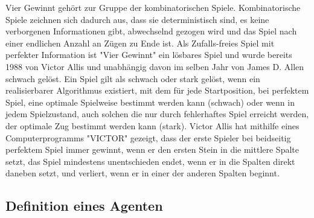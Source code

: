 Vier Gewinnt gehört zur Gruppe der kombinatorischen Spiele. Kombinatorische Spiele zeichnen sich dadurch aus, dass sie deterministisch sind, es keine verborgenen Informationen gibt, abwechselnd gezogen wird und das Spiel nach einer endlichen Anzahl an Zügen zu Ende ist\autocite{KombinatorischeSpieltheorie2019}. Als Zufalls-freies Spiel mit perfekter Information ist "Vier Gewinnt" ein lösbares Spiel und wurde bereits 1988 von Victor Allis\autocite{allisKnowledgeBasedApproachConnectFour1988} und unabhängig davon im selben Jahr von James D. Allen schwach gelöst\autocite{allenExpertPlayConnectFour}. Ein Spiel gilt als schwach oder stark gelöst, wenn ein realisierbarer Algorithmus existiert, mit dem für jede Startposition, bei perfektem Spiel, eine optimale Spielweise bestimmt werden kann (schwach) oder wenn in jedem Spielzustand, auch solchen die nur durch fehlerhaftes Spiel erreicht werden, der optimale Zug bestimmt werden kann (stark)\autocite{GeloesteSpiele2019}. Victor Allis hat mithilfe eines Computerprogramms "VICTOR" gezeigt, dass der erste Spieler bei beidseitig perfektem Spiel immer gewinnt, wenn er den ersten Stein in die mittlere Spalte setzt, das Spiel mindestens unentschieden endet, wenn er in die Spalten direkt daneben setzt, und verliert, wenn er in einer der anderen Spalten beginnt.


\subsection{Definition eines Agenten}

